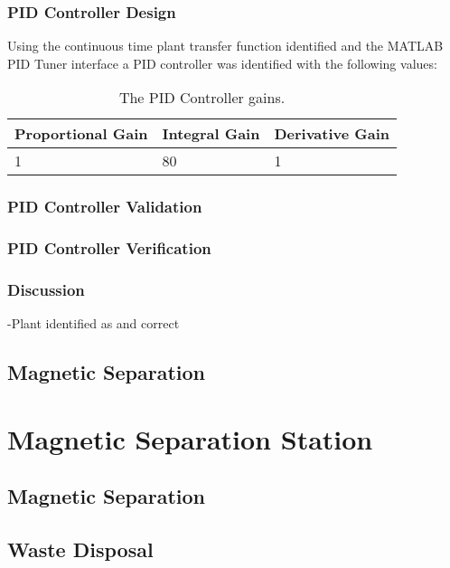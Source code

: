 \subsubsection{PID Controller Design}

Using the continuous time plant transfer function identified and the MATLAB PID Tuner interface a PID controller was identified with the following values:

\begin{table}[h!]
	\begin{center}
		\begin{tabular}{ | p{4cm} |  p{4cm} | p{4cm} | }
			\hline
			Proportional Gain & Integral Gain & Derivative Gain \\ \hline
			1 & 80 & 1 \\ \hline
		\end{tabular}
	\end{center}
	\caption[PID Controller Gains.]{The PID Controller gains.}
	\label{tab:PIDgains}
\end{table}


\subsubsection{PID Controller Validation}

\subsubsection{PID Controller Verification}
\label{sec:controller_verification}

\subsubsection{Discussion}

-Plant identified as and correct

\subsection{Magnetic Separation}

\section{Magnetic Separation Station}

\subsection{Magnetic Separation}

\subsection{Waste Disposal}